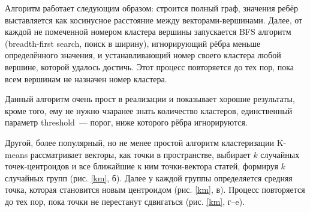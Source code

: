 \documentclass[a4paper, 14pt]{extarticle}
\begin{document}
Алгоритм работает следующим образом: строится полный граф, значения ребёр выставляется как косинусное расстояние между векторами-вершинами. Далее, от каждой не помеченной номером кластера вершины запускается BFS алгоритм (breadth-first search, поиск в ширину), игнорирующий рёбра меньше определённого значения, и устанавливающий номер своего кластера любой вершине, которой удалось достичь. Этот процесс повторяется до тех пор, пока всем вершинам не назначен номер кластера.

Данный алгоритм очень прост в реализации и показывает хорошие результаты, кроме того, ему не нужно чзаранее знать количество кластеров, единственный параметр threshold~--- порог, ниже которого рёбра игнорируются.


Другой, более популярный, но не менее простой алгоритм кластеризации K-means рассматривает векторы, как точки в пространстве, выбирает $k$ случайных точек-центроидов и все ближайшие к ним точки-вектора статей, формируя $k$ случайных групп  (рис. \ref{km}, б). Далее у каждой группы определяется средняя точка, которая становится новым центроидом (рис. \ref{km}, в). Процесс повторяется до тех пор, пока точки не перестанут сдвигаться (рис. \ref{km}, г--e).
\end{document}
